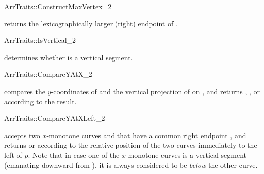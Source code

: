 \ccRefPageBegin
\begin{ccRefConcept}{ArrTraits::ConstructMaxVertex_2}

\ccHasModels{}

  {returns the lexicographically larger (right) endpoint of .}
\end{ccRefConcept}
\ccRefPageEnd

\ccRefPageBegin
\begin{ccRefConcept}{ArrTraits::IsVertical_2}

\ccHasModels{}

  {determines whether  is a vertical segment.}
\end{ccRefConcept}
\ccRefPageEnd

\ccRefPageBegin
\begin{ccRefConcept}{ArrTraits::CompareYAtX_2}

\ccHasModels{}

  {compares the $y$-coordinates of  and the vertical 
  projection of  on , and returns , ,
  or  according to the result.}
\end{ccRefConcept}
\ccRefPageEnd

\ccRefPageBegin
\begin{ccRefConcept}{ArrTraits::CompareYAtXLeft_2}

\ccHasModels{}

  {accepts two $x$-monotone curves  and 
  that have a common right endpoint , and returns  or  according to the relative position of the two
  curves immediately to the left of $p$. Note that in case one of the
  $x$-monotone curves is a vertical segment (emanating downward from
  ), it is always considered to be {\sl below} the other curve.}
\end{ccRefConcept}
\ccRefPageEnd

